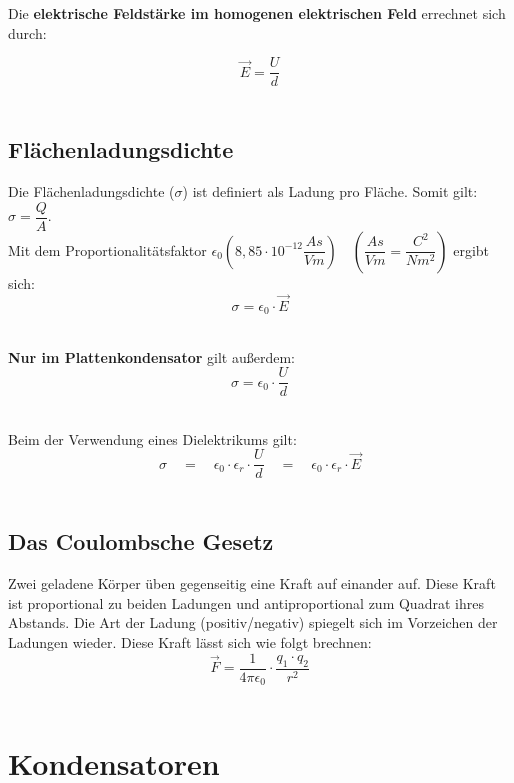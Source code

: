 \documentclass[a4paper]{article}
\begin{document}
Die \textbf{elektrische Feldstärke im homogenen elektrischen Feld} errechnet sich durch:

\Large$$\vec{E} = \dfrac{U}{d}$$\normalsize\\



\subsection{Flächenladungsdichte}

Die Flächenladungsdichte ($\sigma$) ist definiert als Ladung pro Fläche. Somit gilt:$\sigma = \dfrac{Q}{A}$.\\
Mit dem Proportionalitätsfaktor $\epsilon_0 (8,85\cdot10^{-12}\dfrac{As}{Vm}) \quad (\dfrac{As}{Vm} = \dfrac{C^2}{Nm^2})$ ergibt sich:\\
\Large$$\sigma = \epsilon_0 \cdot \vec{E}$$\\ \normalsize

\textbf{Nur im Plattenkondensator} gilt außerdem:\\
\Large$$\sigma = \epsilon_0 \cdot \dfrac{U}{d}$$\\ \normalsize

Beim der Verwendung eines Dielektrikums gilt:\\
\Large$$\sigma \quad=\quad \epsilon_0 \cdot \epsilon_r \cdot \dfrac{U}{d} \quad=\quad \epsilon_0 \cdot \epsilon_r \cdot \vec{E}$$\\ \normalsize


\subsection{Das Coulombsche Gesetz}

Zwei geladene Körper üben gegenseitig eine Kraft auf einander auf. Diese Kraft ist proportional zu beiden Ladungen
und antiproportional zum Quadrat ihres Abstands. Die Art der Ladung (positiv/negativ) spiegelt sich im Vorzeichen
der Ladungen wieder. Diese Kraft lässt sich wie folgt brechnen:\\

\Large$$\vec{F} = \dfrac{1}{4\pi \epsilon_0} \cdot \dfrac{q_1 \cdot q_2}{r^2}$$\\ \normalsize







\section{Kondensatoren}
\end{document}
